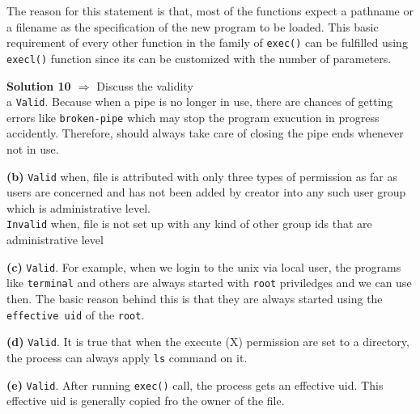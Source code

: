 \documentclass[11pt]{article}
\newcommand\question[3]{{\textbf{Solution #1 $\Rightarrow$} #2} \vspace{.10in}\\}
\renewcommand\part[1]{\vspace{.10in}\textbf{(#1)}}
\begin{document}
The reason for this statement is that, most of the functions expect a pathname or a filename as the specification of the new program to be loaded. This basic requirement of every other function in the family of \texttt{exec()} can be fulfilled using \texttt{execl()} function since its can be customized with the number of parameters. 

\hrulefill

\question{10} {Discuss the validity}

\part{a} \texttt{Valid}. Because when a pipe is no longer in use, there are chances of getting errors like \texttt{broken-pipe} which may stop the program exucution in progress accidently. Therefore, should always take care of closing the pipe ends whenever not in use.

\part{b} \texttt{Valid} when, file is attributed with only three types of permission as far as users are concerned and has not been added by creator into any such user group which is administrative level. 
\newline \\
\texttt{Invalid} when, file is not set up with any kind of other group ids that are administrative level 

\part{c} \texttt{Valid}. For example, when we login to the unix via local user, the programs like \texttt{terminal} and others are always started with \texttt{root} priviledges and we can use then. The basic reason behind this is that they are always started using the \texttt{effective uid} of the \texttt{root}.

\part{d} \texttt{Valid}. It is true that when the execute (X) permission are set to a directory, the process can always apply \texttt{ls} command on it. 

\part{e} \texttt{Valid}. After running \texttt{exec()} call, the process gets an effective uid. This effective uid is generally copied fro the owner of the file. 

\hrulefill
\end{document}
